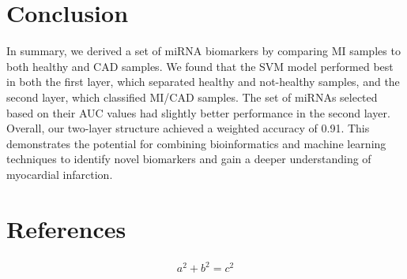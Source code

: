 \documentclass[smallextended]{svjour3}       %
\begin{document}
\hypertarget{conclusion}{%
\section{Conclusion}\label{conclusion}}

In summary, we derived a set of miRNA biomarkers by comparing MI samples
to both healthy and CAD samples. We found that the SVM model performed
best in both the first layer, which separated healthy and not-healthy
samples, and the second layer, which classified MI/CAD samples. The set
of miRNAs selected based on their AUC values had slightly better
performance in the second layer. Overall, our two-layer structure
achieved a weighted accuracy of 0.91. This demonstrates the potential
for combining bioinformatics and machine learning techniques to identify
novel biomarkers and gain a deeper understanding of myocardial
infarction.

\hypertarget{references}{%
\section{References}\label{references}}

\begin{align}
a^2+b^2=c^2
\end{align}
\end{document}
